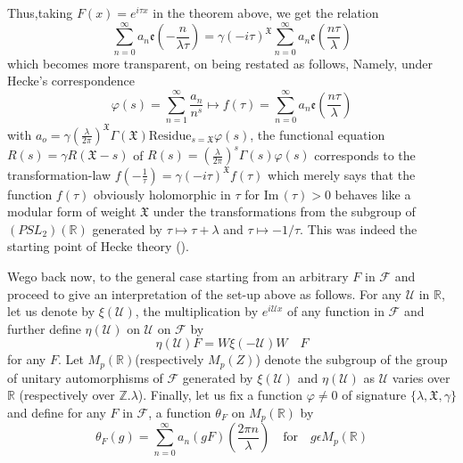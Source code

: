  Thus,\pageoriginale taking $F(x)=e^{i\tau x}$ in the theorem above, we get the
 relation 
\begin{equation*}
  \sum\limits_{n=0}^{\infty}a_{n}\mathfrak{e}
  \left(-\frac{n}{\lambda\tau} \right)=\gamma(-i\tau)^{\mathfrak{X}}
  \sum\limits_{n=0}^{\infty}a_{n} \mathfrak{e}\left(\frac{n\tau}{\lambda}\right)
\end{equation*}
which becomes more transparent, on being restated as follows, Namely,
under Hecke's correspondence
\begin{equation*}
  \varphi(s)=\sum\limits_{n=1}^{\infty}\frac{a_{n}}{n^{s}}\mapsto 
  f(\tau)=\sum\limits_{n=0}^{\infty}a_{n}\mathfrak{e}
  \left(\frac{n\tau}{\lambda}\right)
\end{equation*}
with $a_{o}=\gamma\left(\frac{\lambda}{2\pi}\right)^{\mathfrak{X}}
\Gamma(\mathfrak{X})\text{Residue}_{s=\mathfrak{X}}\varphi(s)$,
the functional equation $R(s)=\gamma R(\mathfrak{X}-s)$ of
$R(s)=\left(\frac{\lambda}{2 \pi}\right)^{s}\Gamma(s)\varphi(s)$
corresponds to the transformation-law
$f\left(-\frac{1}{\tau}\right)=\gamma(-i\tau)^{\mathfrak{X}}f(\tau)$
which merely says that the function $f(\tau)$ obviously holomorphic in
$\tau$ for $\text{Im}\,(\tau)>0$ behaves like a modular form of weight
$\mathfrak{X}$ under the transformations from the subgroup of
$(PSL_{2})(\mathbb{R})$ generated by $\tau\mapsto \tau+\lambda$ and
$\tau \mapsto-1/\tau$. This was indeed  the starting point of Hecke
theory (\cite{Hec 2}).

 We\pageoriginale go back now, to the general case starting from an arbitrary $F$ in
 $\mathscr{F}$ and proceed to give an interpretation of the set-up
 above as follows. For any $\mathscr{U}$ in $\mathbb{R}$, let us
 denote by $\xi(\mathscr{U})$, the multiplication by $e^{i \mathscr{U}
   x}$ of any function in $\mathscr{F}$ and further define
 $\eta(\mathscr{U})$ on $\mathscr{U}$ on $\mathscr{F}$ by 
\begin{equation*}
  \eta(\mathscr{U})F=W\xi(-\mathscr{U})W\quad F
\end{equation*}
for any $F$. Let $M_{p}(\mathbb{R})$(respectively $M_{p}(Z)$) denote
the subgroup of the group of unitary automorphisms of $\mathscr{F}$
generated by $\xi(\mathscr{U})$ and $\eta(\mathscr{U})$ as
$\mathscr{U}$ varies over $\mathbb{R}$ (respectively over
$\mathbb{Z}.\lambda$). Finally, let us fix a function $\varphi \neq 0$
of signature $\{\lambda, \mathfrak{X}, \gamma\}$ and define for any $F$
in $\mathscr{F}$, a function $\theta_{F}$ on $M_{p}(\mathbb{R})$ by 
\begin{equation*}
\theta_{F}(g)=\sum\limits_{n=0}^{\infty}a_{n}(gF)\left(\frac{2 \pi
  n}{\lambda}\right)\quad \text{for}\quad g \epsilon M_{p}(\mathbb{R})
\end{equation*}

